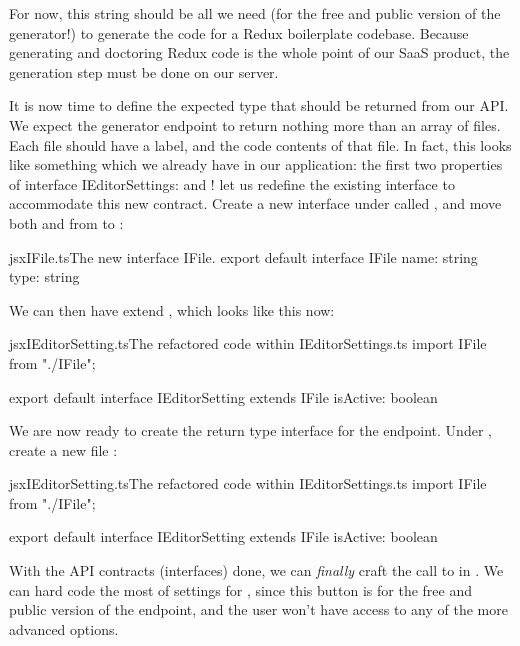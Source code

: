 \documentclass[paper=6in:9in,pagesize=pdftex,headinclude=on,footinclude=on,12pt,twoside]{scrbook}
\begin{document}
For now, this  string should be all we need (for the free and public version of the generator!) to generate the code for a Redux boilerplate codebase. Because generating and doctoring Redux code is the whole point of our SaaS product, the generation step must be done on our server.

It is now time to define the expected type that should be returned from our API. We expect the generator endpoint to return nothing more than an array of files. Each file should have a label, and the code contents of that file. In fact, this looks like something which we already have in our application: the first two properties of interface {IEditorSettings}:  and ! let us redefine the existing  interface to accommodate this new contract. Create a new interface under  called , and move both  and  from  to :

\begin{codeInput}{jsx}{IFile.ts}{The new interface IFile.}
export default interface IFile {
  name: string
  type: string
}
\end{codeInput}

We can then have  extend , which looks like this now:

\begin{codeInput}{jsx}{IEditorSetting.ts}{The refactored code within IEditorSettings.ts}
import IFile from "./IFile";

export default interface IEditorSetting extends IFile {
  isActive: boolean
}  
\end{codeInput}


We are now ready to create the return type interface for the  endpoint. Under , create a new file : 

\begin{codeInput}{jsx}{IEditorSetting.ts}{The refactored code within IEditorSettings.ts}
import IFile from "./IFile";

export default interface IEditorSetting extends IFile {
  isActive: boolean
}  
\end{codeInput}

With the API contracts (interfaces) done, we can \textit{finally} craft the call to  in . We can hard code the most of settings for , since this button is for the free and public version of the endpoint, and the user won't have access to any of the more advanced options.
\end{document}
